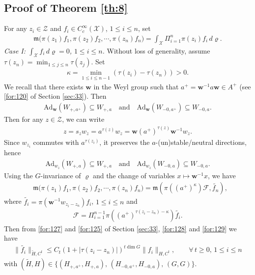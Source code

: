 \documentclass[11 pt]{amsart}
\newcommand{\norm}[1]{\lVert#1\rVert}
\theoremstyle{definition}
\numberwithin{equation}{section}
\begin{document}
\subsection{Proof of Theorem \ref{th:8}}  For any $z_i\in \mathcal{Z}$ and $f_i\in C_c^\infty(\mathcal{X})$, $1\leq i\leq n$, set
\begin{align*}
  \mathfrak{m}\big(\pi(z_1)f_1,\pi(z_2)f_2,\cdots,\pi(z_n)f_n \big)=\int_{\mathcal{X}} \Pi_{i=1}^{n} \pi(z_i)f_i \,d\varrho.
\end{align*}
\emph{Case I: $\int_{\mathcal{X}} f_i \, d\varrho=0$, $1\leq i\leq n$.} Without loss of generality, assume $\tau(z_{n})=\min_{1\leq j\leq n} \tau(z_j)$. Set
\begin{align*}
 \kappa=\min_{1\leq i\leq n-1} (\tau(z_i)-\tau(z_{n}))>0.
\end{align*}
We recall that there exists $\textbf{w}$ in the Weyl group such that $a^+=\textbf{w}^{-1}a\textbf{w}\in A^+$ (see \eqref{for:120} of Section \ref{sec:33}).
Then
\begin{align}\label{for:128}
 \text{Ad}_{\textbf{w}}(W_{+,a^+})\subseteq W_{+,a}\quad\text{and}\quad \text{Ad}_{\textbf{w}}(W_{-0,a^+})\subseteq W_{-0,a}.
\end{align}
Then for any $z\in \mathcal{Z}$, we can write
\begin{align*}
 z=s_zw_z=a^{\tau(z)}w_z=\textbf{w}(a^+)^{\tau(z)}\textbf{w}^{-1}w_z.
\end{align*}
Since $w_{z_i}$ commutes with $a^{\tau(z_i)}$, it preserves the $a$-(un)stable/neutral directions, hence
\begin{align}\label{for:129}
 \text{Ad}_{w_z}(W_{+,a})\subseteq W_{+,a}\quad\text{and}\quad \text{Ad}_{w_z}(W_{-0,a})\subseteq W_{-0,a}.
\end{align}
Using the $G$-invariance of $\varrho$ and the change of variables $x\mapsto \mathbf w^{-1}x$, we have
\begin{align}\label{for:2}
 &\mathfrak{m}\big(\pi(z_1)f_1,\pi(z_2)f_2,\cdots,\pi(z_n)f_n \big)=\mathfrak{m}(\pi((a^+)^\kappa)\mathcal{F}, \widetilde{f_{n}}),
\end{align}
where $\widetilde{f_i}=\pi(\textbf{w}^{-1}w_{z_i-z_n})f_i$, $1\leq i\leq n$ and
\begin{gather*}
\mathcal{F}=\Pi_{i=1}^{n-1} \pi((a^+)^{\tau(z_i-z_n)-\kappa})\widetilde{f_i}.
\end{gather*}
Then from \eqref{for:127} and \eqref{for:125} of Section \ref{sec:33}, \eqref{for:128} and \eqref{for:129} we have
\begin{align}\label{for:130}
 \norm{\widetilde{f_i}}_{\tilde{H}, C^t}\leq C_t(1+|\tau(z_i-z_n)|)^{t\dim G}\norm{f_i}_{H, C^t},\qquad \forall\,t\geq0,\,1\leq i\leq n
\end{align}
with $(\tilde H,H)\in\{(H_{+,a^+},H_{+,a}),\,(H_{-0,a^+},H_{-0,a}),\,(G,G)\}$.
\end{document}

